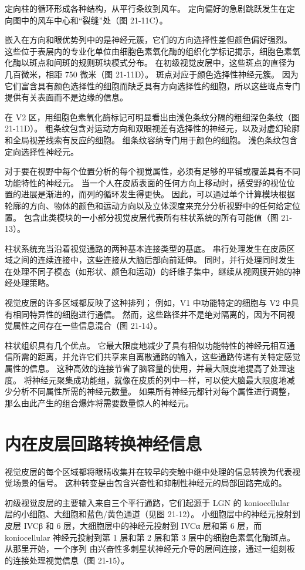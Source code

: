 定向柱的循环形成各种结构，从平行条纹到风车。 定向偏好的急剧跳跃发生在定向图中的风车中心和“裂缝”处（图 21-11C）。

嵌入在方向和眼优势列中的是神经元簇，它们的方向选择性差但颜色偏好强烈。 这些位于表层内的专业化单位由细胞色素氧化酶的组织化学标记揭示，细胞色素氧化酶以斑点和间斑的规则斑块模式分布。 在初级视觉皮层中，这些斑点的直径为几百微米，相距 750 微米（图 21-11D）。 斑点对应于颜色选择性神经元簇。 因为它们富含具有颜色选择性的细胞而缺乏具有方向选择性的细胞，所以这些斑点专门提供有关表面而不是边缘的信息。

在 V2 区，用细胞色素氧化酶标记可明显看出由浅色条纹分隔的粗细深色条纹（图 21-11D）。 粗条纹包含对运动方向和双眼视差有选择性的神经元，以及对虚幻轮廓和全局视差线索有反应的细胞。 细条纹容纳专门用于颜色的细胞。 浅色条纹包含定向选择性神经元。

对于要在视野中每个位置分析的每个视觉属性，必须有足够的平铺或覆盖具有不同功能特性的神经元。 当一个人在皮质表面的任何方向上移动时，感受野的视位位置的进展是渐进的，而列的循环发生得更快。 因此，可以通过单个计算模块根据轮廓的方向、物体的颜色和运动方向以及立体深度来充分分析视野中的任何给定位置。 包含此类模块的一小部分视觉皮层代表所有柱状系统的所有可能值（图 21-13）。

柱状系统充当沿着视觉通路的两种基本连接类型的基底。 串行处理发生在皮质区域之间的连续连接中，这些连接从大脑后部向前延伸。 同时，并行处理同时发生在处理不同子模态（如形状、颜色和运动）的纤维子集中，继续从视网膜开始的神经处理策略。

视觉皮层的许多区域都反映了这种排列； 例如，V1 中功能特定的细胞与 V2 中具有相同特异性的细胞进行通信。 然而，这些路径并不是绝对隔离的，因为不同视觉属性之间存在一些信息混合（图 21-14）。

柱状组织具有几个优点。 它最大限度地减少了具有相似功能特性的神经元相互通信所需的距离，并允许它们共享来自离散通路的输入，这些通路传递有关特定感觉属性的信息。 这种高效的连接节省了脑容量的使用，并最大限度地提高了处理速度。 将神经元聚集成功能组，就像在皮质的列中一样，可以使大脑最大限度地减少分析不同属性所需的神经元数量。 如果所有神经元都针对每个属性进行调整，那么由此产生的组合爆炸将需要数量惊人的神经元。


\section{内在皮层回路转换神经信息}
视觉皮层的每个区域都将眼睛收集并在较早的突触中继中处理的信息转换为代表视觉场景的信号。 这种转变是由包含兴奋性和抑制性神经元的局部回路完成的。

初级视觉皮层的主要输入来自三个平行通路，它们起源于 LGN 的 koniocellular 层的小细胞、大细胞和蓝色/黄色通道（见图 21-12）。 小细胞层中的神经元投射到皮层 IVCβ 和 6 层，大细胞层中的神经元投射到 IVCα 层和第 6 层，而 koniocellular 神经元投射到第 1 层和第 2 层和第 3 层中的细胞色素氧化酶斑点。从那里开始，一个序列 由兴奋性多刺星状神经元介导的层间连接，通过一组刻板的连接处理视觉信息（图 21-15）。

